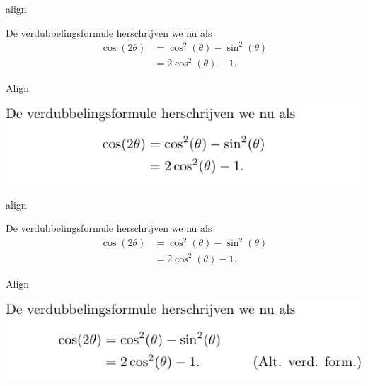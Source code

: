 \documentclass[presentatie.tex]{subfiles}
\begin{document}

\begin{saveblock}{align}
	\begin{highlightblock}[gobble=8,linewidth=\textwidth,
		framexleftmargin=0.25em,xleftmargin=0.25em]
		De verdubbelingsformule herschrijven we nu als
		\begin{align*}
			\cos(2\theta) &= \cos^2(\theta) - \sin^2(\theta)\\
			&= 2\cos^2(\theta)-1.
		\end{align*}
	\end{highlightblock}
\end{saveblock}


\begin{frame}{Align}

	\includegraphics[width=\linewidth,height=0.4\textheight,keepaspectratio]{assets/5_Formules/mathAlignNoNumbers.pdf}
\end{frame}



\begin{saveblock}{align}
	\begin{highlightblock}[gobble=8,linewidth=\textwidth,
		framexleftmargin=0.25em,xleftmargin=0.25em]
		De verdubbelingsformule herschrijven we nu als
		\begin{align*}
			\cos(2\theta) &= \cos^2(\theta) - \sin^2(\theta)\\
			&= 2\cos^2(\theta)-1. \tag{Alt. verd. form.}
		\end{align*}
	\end{highlightblock}
\end{saveblock}

\begin{frame}{Align}

	\includegraphics[width=\linewidth,height=0.4\textheight,keepaspectratio]{assets/5_Formules/mathTag.pdf}
\end{frame}
\end{document}
